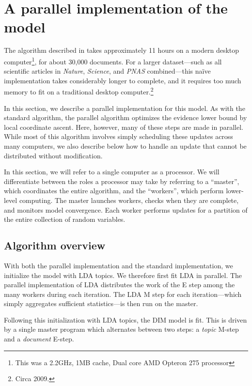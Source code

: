 \section{A parallel implementation of the model}
\label{section:influence_parallel_inference}

The algorithm described in  takes approximately 11
hours on a modern desktop computer\footnote{This was a 2.2GHz, 1MB
  cache, Dual core AMD Opteron 275 processor}, for about 30,000
documents.  For a larger dataset---such as all scientific articles in
\emph{Nature}, \emph{Science}, and \emph{PNAS} combined---this
na\"{i}ve implementation takes considerably longer to complete, and it
requires too much memory to fit on a traditional desktop
computer.\footnote{Circa 2009.}

In this section, we describe a parallel implementation for this model.
As with the standard algorithm, the parallel algorithm optimizes the evidence
lower bound by local coordinate ascent.  Here, however, many of these
steps are made in parallel.  While most of this algorithm involves
simply scheduling these updates across many computers, we also
describe below how to handle an update that cannot be distributed
without modification.

In this section, we will refer to a single computer as a processor.
We will differentiate between the roles a processor may take by
referring to a ``master'', which coordinates the entire algorithm, and
the ``workers'', which perform lower-level computing.  The master
launches workers, checks when they are complete, and monitors model
convergence.  Each worker performs updates for a partition of the
entire collection of random variables.

\subsection*{Algorithm overview}
With both the parallel implementation and the standard implementation,
we initialize the model with LDA topics.  We therefore first fit LDA
in parallel.  The parallel implementation of LDA distributes the work
of the E step among the many workers during each iteration.  The LDA M
step for each iteration---which simply aggregates sufficient
statistics---is then run on the master.

Following this initialization with LDA topics, the DIM model is fit.  This is
driven by a single master program which alternates between two steps:
a \emph{topic} M-step and a \emph{document} E-step.

